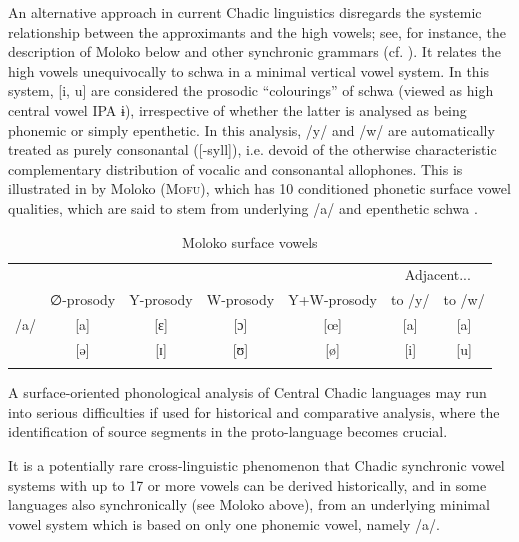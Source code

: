 \documentclass[output=paper]{langscibook}
\begin{document}
An alternative approach in current Chadic linguistics disregards the systemic relationship between the approximants and the high vowels; see, for instance, the description of Moloko below \citep{FriesenEtAl2017} and other synchronic grammars (cf. \citealt{Schuh2017}). It relates the high vowels unequivocally to schwa in a minimal vertical vowel system. In this system, [i, u] are considered the prosodic ``colourings'' of schwa (viewed as high central vowel IPA ɨ), irrespective of whether the latter is analysed as being phonemic or simply epenthetic. In this analysis, /y/ and /w/ are automatically treated as purely consonantal ([-syll]), i.e. devoid of the otherwise characteristic complementary distribution of vocalic and consonantal allophones. This is illustrated in  by Moloko (\textsc{Mofu}), which has 10 conditioned phonetic surface vowel qualities, which are said to stem from underlying /a/ and epenthetic schwa \citep[53]{FriesenEtAl2017}.

\begin{table}
\caption{Moloko surface vowels}
\label{tab:wolff:4}
\begin{tabular}{ccccccc}
\lsptoprule
 &            &           &           &             & \multicolumn{2}{c}{Adjacent...}\\
 & ∅-prosody & Y-prosody & W-prosody & Y+W-prosody &  to /y/ & to /w/\\
 \midrule
 /a/ & [a] & [ɛ] & [ɔ] & [œ] & [a] & [a]\\\relax
 [ə] & [ə] & [ɪ] & [ʊ] & [ø] & [i] & [u]\\
\lspbottomrule
\end{tabular}
\end{table}

A surface-oriented phonological analysis of Central Chadic languages may run into serious difficulties if used for historical and comparative analysis, where the identification of source segments in the proto-language becomes crucial. 

It is a potentially rare cross-linguistic phenomenon that Chadic synchronic vowel systems with up to 17 or more vowels can be derived historically, and in some languages also synchronically (see Moloko above), from an underlying minimal vowel system which is based on only one phonemic vowel, namely /a/.
\end{document}
